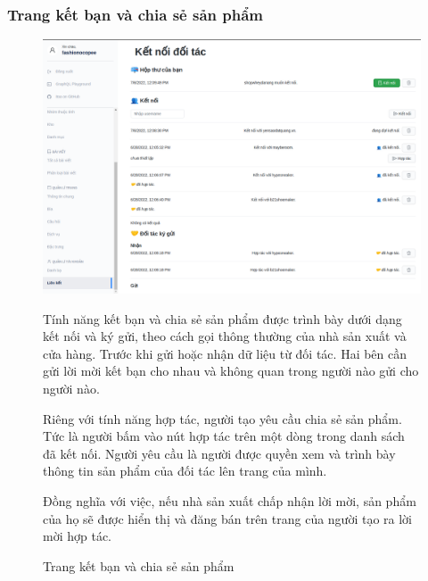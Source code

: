 \subsubsection{Trang kết bạn và chia sẻ sản phẩm}
\FloatBarrier
\begin{figure}[!htbp]\fontsize{13px}{13px}\selectfont
\centering
		\includegraphics[width=\textwidth]{./results/contract}
		\caption{Trang kết bạn và chia sẻ sản phẩm}
\justifying
Tính năng kết bạn và chia sẻ sản phẩm được trình bày dưới dạng kết nối và ký gửi, theo cách gọi thông thường của nhà sản xuất và cửa hàng. Trước khi gửi hoặc nhận dữ liệu từ đối tác. Hai bên cần gửi lời mời kết bạn cho nhau và không quan trong người nào gửi cho người nào.

Riêng với tính năng hợp tác, người tạo yêu cầu chia sẻ sản phẩm. Tức là người bấm vào nút hợp tác trên một dòng trong danh sách đã kết nối. Người yêu cầu là người được quyền xem và trình bày thông tin sản phẩm của đối tác lên trang của mình.

Đồng nghĩa với việc, nếu nhà sản xuất chấp nhận lời mời, sản phẩm của họ sẽ được hiển thị và đăng bán trên trang của người tạo ra lời mời hợp tác.
\end{figure}
\clearpage
